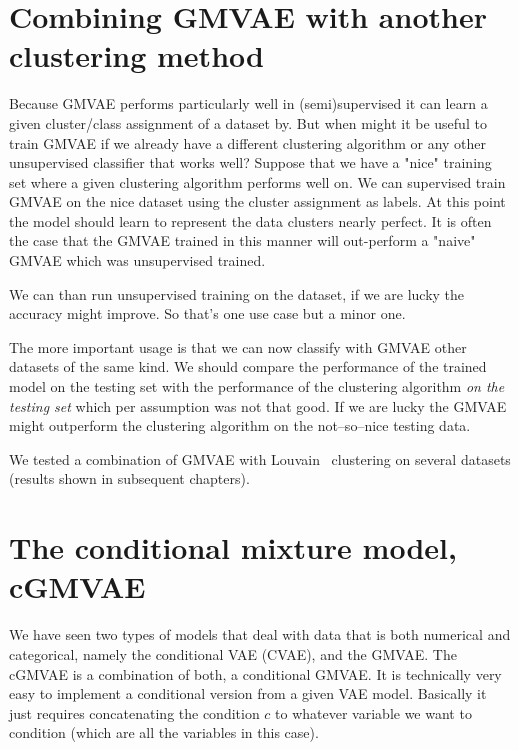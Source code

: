 \documentclass[11pt, a4paper]{report}
\theoremstyle{plain}
\theoremstyle{definition}
\theoremstyle{remark}
\begin{document}
\section{Combining GMVAE with another clustering method}

Because GMVAE performs particularly well in (semi)supervised 
it can learn a given cluster/class assignment of a dataset by.
But when might it be useful to train GMVAE if we already have a different
clustering algorithm or any other unsupervised classifier that works well?
Suppose that we have a "nice" training set where a given clustering algorithm
performs well on.
We can supervised train GMVAE on the nice dataset using the cluster assignment
as labels. At this point the model should learn to represent the data clusters
nearly perfect.
It is often the case that the GMVAE trained in this manner will out-perform 
a "naive" GMVAE which was unsupervised trained.

We can than run unsupervised training on the dataset, if we are
lucky the accuracy might improve. So that's one use case but a minor one.

The more important usage is that we can now classify with GMVAE other datasets
of the same kind.
We should compare the performance of the trained model on the testing set with
the performance of the clustering algorithm \emph{on the testing set} which per
assumption was not that good. If we are lucky the GMVAE might outperform the
clustering algorithm on the not--so--nice testing data.

We tested a combination of GMVAE with Louvain~\cite{que2015scalable} clustering
on several datasets (results shown in subsequent chapters).


\section{The conditional mixture model, cGMVAE}

We have seen two types of models that deal with data that is both numerical and
categorical, namely the conditional VAE (CVAE), and the GMVAE.
The cGMVAE is a combination of both, a conditional GMVAE. 
It is technically very easy to implement a conditional version from a 
given VAE model. Basically it just requires 
concatenating the condition $c$ to whatever variable we want to condition
(which are all the variables in this case).
\end{document}
